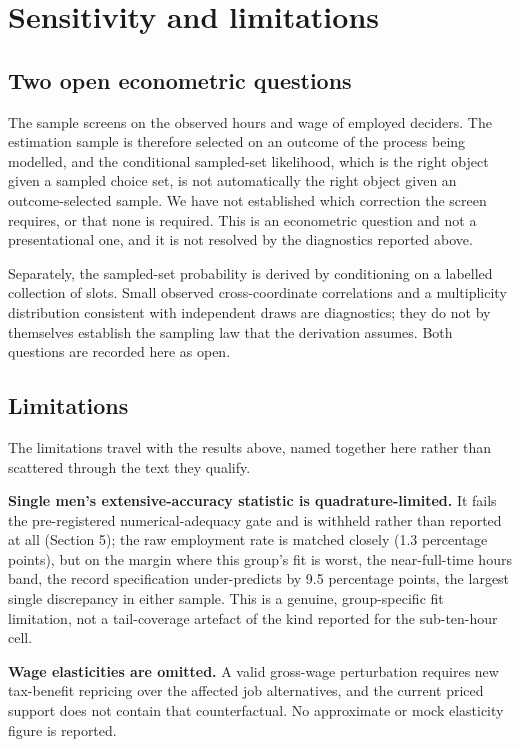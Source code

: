 \documentclass[11pt,a4paper]{article}
\begin{document}
\section{Sensitivity and limitations}\label{sensitivity-and-limitations}

\subsection{Two open econometric questions}\label{two-open-econometric-questions}

The sample screens on the observed hours and wage of employed deciders. The estimation sample is therefore selected on an outcome of the process being modelled, and the conditional sampled-set likelihood, which is the right object given a sampled choice set, is not automatically the right object given an outcome-selected sample. We have not established which correction the screen requires, or that none is required. This is an econometric question and not a presentational one, and it is not resolved by the diagnostics reported above.

Separately, the sampled-set probability is derived by conditioning on a labelled collection of slots. Small observed cross-coordinate correlations and a multiplicity distribution consistent with independent draws are diagnostics; they do not by themselves establish the sampling law that the derivation assumes. Both questions are recorded here as open.

\subsection{Limitations}\label{limitations}

The limitations travel with the results above, named together here rather than scattered through the text they qualify.

\textbf{Single men's extensive-accuracy statistic is quadrature-limited.} It fails the pre-registered numerical-adequacy gate and is withheld rather than reported at all (Section 5); the raw employment rate is matched closely (1.3 percentage points), but on the margin where this group's fit is worst, the near-full-time hours band, the record specification under-predicts by 9.5 percentage points, the largest single discrepancy in either sample. This is a genuine, group-specific fit limitation, not a tail-coverage artefact of the kind reported for the sub-ten-hour cell.

\textbf{Wage elasticities are omitted.} A valid gross-wage perturbation requires new tax-benefit repricing over the affected job alternatives, and the current priced support does not contain that counterfactual. No approximate or mock elasticity figure is reported.
\end{document}
